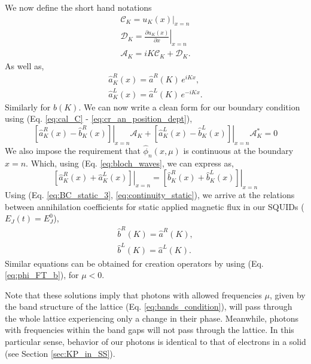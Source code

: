 %
We now define the short hand notations
%
\begin{gather}
    \mathcal{C}_K = \left.u_K(x)\right|_{x=n}
    \label{eq:cal_C}\\
    \mathcal{D}_K = \left.\frac{\partial u_K(x)}{\partial x}\right|_{x=n}
    \label{eq:cal_D}\\
    \mathcal{A}_K = iK\mathcal{C}_K + \mathcal{D}_K.
    \label{eq:cal_A}
\end{gather}
%
As well as, 
\begin{subequations}\label{eq:cr_an_position_dept}
\begin{eqnarray}
    \hat{a}^R_K(x) = \hat{a}^R(K)\,e^{i K x},
    \\
    \hat{a}^L_K(x) = \hat{a}^L(K)\,e^{-i K x}. 
\end{eqnarray}
\end{subequations}
%
Similarly for $\hat{b}(K)$. We can now write a clean form for our boundary condition using (Eq. \ref{eq:cal_C} - \ref{eq:cr_an_position_dept}),
%
\begin{equation}\label{eq:BC_static_3}
    \left.\left[\hat{a}^R_K(x) - \hat{b}_K^R(x)\right]\right|_{x=n} \mathcal{A}_K
    +
    \left.\left[\hat{a}^L_K(x) - \hat{b}^L_K(x)\right]\right|_{x=n}\mathcal{A}^*_K = 0 
\end{equation}
%
We also impose the requirement that $\hat{\phi}_n(x,\mu)$ is continuous at the boundary $x=n$. Which, using (Eq. \ref{eq:bloch_waves}, we can express as,
%
\begin{equation}\label{eq:continuity_static}
    \left.\left[\hat{a}^R_K(x) + \hat{a}^L_K(x)\right]\right|_{x=n}
    =
    \left.\left[\hat{b}^R_K(x) + \hat{b}^L_K(x)\right]\right|_{x=n}
\end{equation}
%
Using (Eq. \ref{eq:BC_static_3}, \ref{eq:continuity_static}), we arrive at the relations between annihilation coefficients for static applied magnetic flux in our SQUIDs ($E_J(t)= E^0_J$),
%
\begin{subequations}\label{eq:static_solutions}
\begin{eqnarray}
    \hat{b}^R(K) = \hat{a}^R(K),
    \\
    \hat{b}^L(K) = \hat{a}^L(K).
\end{eqnarray}
\end{subequations}
%
Similar equations can be obtained for creation operators by using (Eq. \ref{eq:phi_FT_b}), for $\mu<0$. 

Note that these solutions imply that photons with allowed frequencies $\mu$, given by the band structure of the lattice (Eq. \ref{eq:bands_condition}), will pass through the whole lattice experiencing only a change in their phase. Meanwhile, photons with frequencies within the band gaps will not pass through the lattice. In this particular sense, behavior of our photons is identical to that of electrons in a solid (see Section \ref{sec:KP_in_SS}).

